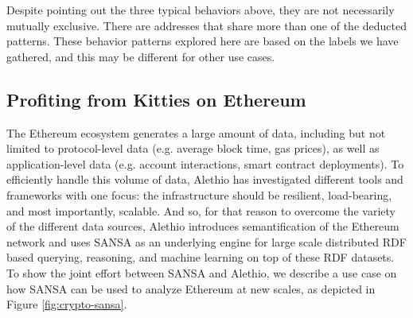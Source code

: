 Despite pointing out the three typical behaviors above, they are not necessarily mutually exclusive.
There are addresses that share more than one of the deducted patterns.
These behavior patterns explored here are based on the labels we have gathered, and this may be different for other use cases.


\subsection{Profiting from Kitties on Ethereum}
\label{sec:kitties-use-case}
The Ethereum ecosystem generates a large amount of data, including but not limited to protocol-level data (e.g. average block time, gas prices), as well as application-level data (e.g. account interactions, smart contract deployments). 
To efficiently handle this volume of data, Alethio has investigated different tools and frameworks with one focus: the infrastructure should be resilient, load-bearing, and most importantly, scalable.
And so, for that reason to overcome the variety of the different data sources, Alethio introduces semantification of the Ethereum network and uses SANSA as an underlying engine for large scale distributed \gls{RDF} based querying, reasoning, and machine learning on top of these \gls{RDF} datasets.
To show the joint effort between SANSA and Alethio, we describe a use case on how SANSA can be used to analyze Ethereum at new scales, as depicted in Figure \ref{fig:crypto-sansa}. 

